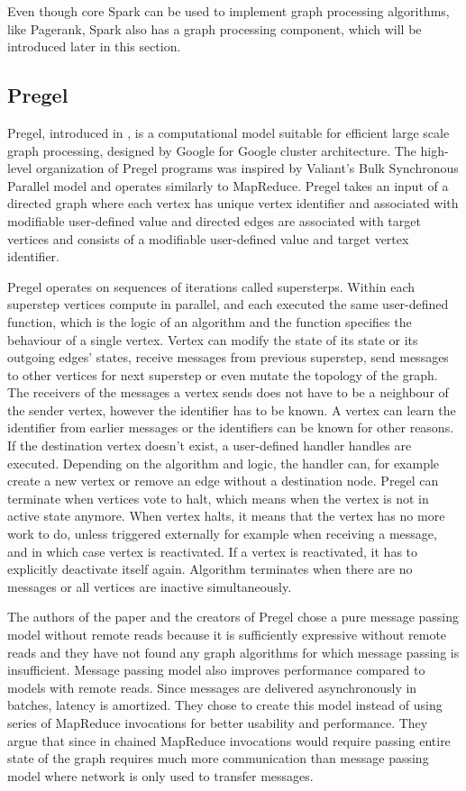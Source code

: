 \documentclass{article}
\theoremstyle{definition}
\begin{document}
Even though core Spark can be used to implement graph processing algorithms, like Pagerank, Spark also has a graph processing component, which will be introduced later in this section. 

\subsection{Pregel}
Pregel, introduced in \cite{Malewicz2010}, is a computational model suitable for efficient large scale graph processing, designed by Google for Google cluster architecture. The high-level organization of Pregel programs was inspired by Valiant's Bulk Synchronous Parallel model \cite{Valiant} and operates similarly to MapReduce. Pregel takes an input of a directed graph where each vertex has unique vertex identifier and associated with modifiable user-defined value and directed edges are associated with target vertices and consists of a modifiable user-defined value and target vertex identifier.

Pregel operates on sequences of iterations called supersterps. Within each superstep vertices compute in parallel, and each executed the same user-defined function, which is the logic of an algorithm and the function specifies the behaviour of a single vertex. Vertex can modify the state of its state or its outgoing edges' states, receive messages from previous superstep, send messages to other vertices for next superstep or even mutate the topology of the graph. The receivers of the messages a vertex sends does not have to be a neighbour of the sender vertex, however the identifier has to be known. A vertex can learn the identifier from earlier messages or the identifiers can be known for other reasons. If the destination vertex doesn't exist, a user-defined handler handles are executed. Depending on the algorithm and logic, the handler can, for example create a new vertex or remove an edge without a destination node. Pregel can terminate when vertices vote to halt, which means when the vertex is not in active state anymore. When vertex halts, it means that the vertex has no more work to do, unless triggered externally for example when receiving a message, and in which case vertex is reactivated. If a vertex is reactivated, it has to explicitly deactivate itself again. Algorithm terminates when there are no messages or all vertices are inactive simultaneously. 

The authors of the paper and the creators of Pregel chose a pure message passing model without remote reads because it is sufficiently expressive without remote reads and they have not found any graph algorithms for which message passing is insufficient. Message passing model also improves performance compared to models with remote reads. Since messages are delivered asynchronously in batches, latency is amortized. They chose to create this model instead of using series of MapReduce invocations for better usability and performance. They argue that since in chained MapReduce invocations would require passing entire state of the graph requires much more communication than message passing model where network is only used to transfer messages. 
\end{document}
